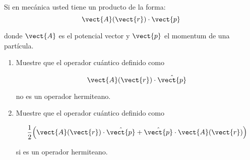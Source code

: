 \documentclass[../main.tex]{subfiles}
\begin{document}
\begin{problema}
	Si en mecánica usted tiene un producto de la forma:
	\begin{equation*}
		\vect{A}(\vect{r})\cdot \vect{p}
	\end{equation*}

	donde \(\vect{A}\) es el potencial vector y \(\vect{p}\) el
	momentum de una partícula.

	\begin{enumerate}
		\item Muestre que el operador cuántico definido como

		      \begin{equation*}
			      \vect{A}(\vect{r})\cdot \hat{\vect{p}}
		      \end{equation*}

		      no es un operador hermiteano.
		\item Muestre que el operador cuántico definido como

		      \begin{equation*}
			      \dfrac{1}{2}\Bigl(\vect{A}(\vect{r})\cdot \hat{\vect{p}} + \hat{\vect{p}}\cdot \vect{A}(\vect{r})\Bigr)
		      \end{equation*}

		      si es un operador hermiteano.
	\end{enumerate}
\end{problema}
\end{document}
